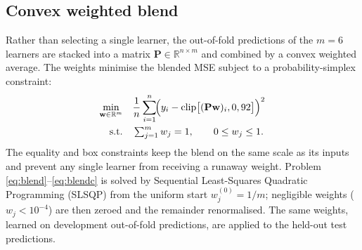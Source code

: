 \documentclass[review,12pt]{elsarticle}
\begin{document}
\subsection{Convex weighted blend}
Rather than selecting a single learner, the out-of-fold predictions of the $m=6$
learners are stacked into a matrix $\mathbf P\in\mathbb R^{n\times m}$ and combined
by a convex weighted average. The weights minimise the blended MSE subject to a
probability-simplex constraint:
\begin{align}
\min_{\mathbf w\in\mathbb R^{m}}\quad
&\frac{1}{n}\sum_{i=1}^{n}\!\Bigl(y_i-\mathrm{clip}\bigl[(\mathbf P\mathbf w)_i,0,92\bigr]\Bigr)^2
\label{eq:blend}\\
\text{s.t.}\quad &\textstyle\sum_{j=1}^{m}w_j=1,\qquad 0\le w_j\le 1.
\label{eq:blendc}
\end{align}
The equality and box constraints keep the blend on the same scale as its inputs
and prevent any single learner from receiving a runaway weight. Problem
\eqref{eq:blend}--\eqref{eq:blendc} is solved by Sequential Least-Squares
Quadratic Programming (SLSQP) from the uniform start $w_j^{(0)}=1/m$; negligible
weights ($w_j<10^{-4}$) are then zeroed and the remainder renormalised. The same
weights, learned on development out-of-fold predictions, are applied to the
held-out test predictions.
\end{document}
